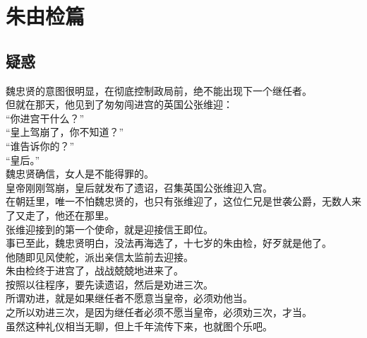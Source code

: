 \chapter*{朱由检篇}
\section{疑惑}
\ifnum{}
	\begin{multicols}{\theparacolNo}
\fi
魏忠贤的意图很明显，在彻底控制政局前，绝不能出现下一个继任者。\\

但就在那天，他见到了匆匆闯进宫的英国公张维迎：\\

“你进宫干什么？”\\

“皇上驾崩了，你不知道？”\\

“谁告诉你的？”\\

“皇后。”\\

魏忠贤确信，女人是不能得罪的。\\

皇帝刚刚驾崩，皇后就发布了遗诏，召集英国公张维迎入宫。\\

在朝廷里，唯一不怕魏忠贤的，也只有张维迎了，这位仁兄是世袭公爵，无数人来了又走了，他还在那里。\\

张维迎接到的第一个使命，就是迎接信王即位。\\

事已至此，魏忠贤明白，没法再海选了，十七岁的朱由检，好歹就是他了。\\

他随即见风使舵，派出亲信太监前去迎接。\\

朱由检终于进宫了，战战兢兢地进来了。\\

按照以往程序，要先读遗诏，然后是劝进三次。\\

所谓劝进，就是如果继任者不愿意当皇帝，必须劝他当。\\

之所以劝进三次，是因为继任者必须不愿当皇帝，必须劝三次，才当。\\

虽然这种礼仪相当无聊，但上千年流传下来，也就图个乐吧。\\


\end{multicols}
